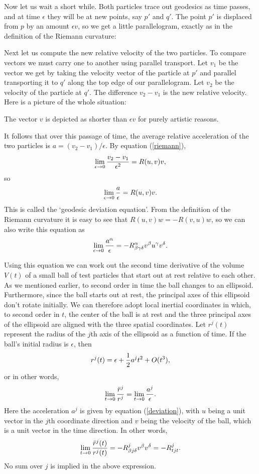 Now let us wait a short while.  Both particles trace out geodesics as
time passes, and at time $\epsilon$ they will be at new points, say $p'$
and $q'$.  The point $p'$ is displaced from $p$ by an amount $\epsilon v$,
so we get a little parallelogram, exactly as in
the definition of the Riemann curvature:

\medskip
\medskip
\centerline{\epsfysize=1.4in} \medskip

\noindent
Next let us compute the new relative velocity
of the two particles.  To compare vectors we must carry one to
another using parallel transport.  Let $v_1$ be the vector we get by
taking the velocity vector of the particle at $p'$ and parallel
transporting it to $q'$ along the top edge of our parallelogram.  Let
$v_2$ be the velocity of the particle at $q'$.  The difference $v_2 -
v_1$ is the new relative velocity.  Here is a picture of the whole
situation:

\medskip
\centerline{\epsfysize=1.8in} \medskip

\noindent
The vector $v$ is depicted as shorter than $\epsilon v$ for
purely artistic reasons.  

It follows that over this passage of time, the average
relative acceleration of the two particles is 
$a = (v_2 - v_1)/\epsilon$.  By equation (\ref{riemann}), 
\[  \lim_{\epsilon \to 0} {v_2 - v_1 \over \epsilon^2} = R(u,v)v,\]
so 
\[  \lim_{\epsilon \to 0} {a \over \epsilon} = R(u,v)v . \]
This is called the `geodesic deviation equation'.  From the
definition of the Riemann curvature it is easy to see that
$R(u,v)w = -R(v,u)w$, so we can also write this equation as
\begin{equation} \lim_{\epsilon \to 0} {a^\alpha \over \epsilon} =
 - R^\alpha_{\beta\gamma\delta} v^\beta u^\gamma v^\delta .
\label{deviation}
\end{equation}

Using this equation we can work out the second time derivative of the
volume $V(t)$ of a small ball of test particles that start out at rest
relative to each other.  As we mentioned earlier, to second order
in time the ball changes to an ellipsoid.   Furthermore, since the ball 
starts out at rest, the principal axes of this ellipsoid don't rotate
initially.   We can therefore adopt local inertial coordinates in which, 
to second order in $t$, the center of the ball is at rest and the three
principal axes of the ellipsoid are aligned with the three spatial
coordinates.  Let $r^j(t)$ represent the radius of the $j$th axis 
of the ellipsoid as a function of time.  If the ball's initial radius 
is $\epsilon$, then
$$
r^j(t) = \epsilon + {1\over 2}a^j t^2 + O(t^3),
$$
or in other words,
$$
\lim_{t\to 0} {\ddot r^j\over r^j} = \lim_{t\to 0}{a^j\over\epsilon}.
$$
Here the acceleration $a^j$ is given by equation (\ref{deviation}), with
$u$ being a unit vector in the $j$th coordinate direction
and $v$ being the velocity of the ball, which is a unit vector
in the time direction.
In other words,
$$
\lim_{t\to 0} {\ddot r^j(t)\over r^j(t)} = - R^j_{\beta j\delta}v^\beta 
v^\delta=-R^j_{tjt}.
$$
No sum over $j$ is implied in the above expression.

